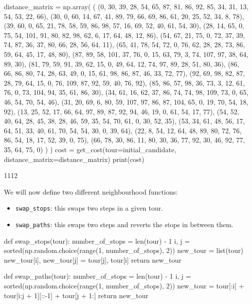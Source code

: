 \begin{pyin}
distance_matrix = np.array(
    (
    (0, 30, 39, 28, 54, 65, 87, 81, 86, 92, 85, 34, 31, 13, 54, 53, 22, 66),
    (30, 0, 60, 14, 67, 41, 89, 79, 66, 69, 86, 61, 20, 25, 52, 34, 8, 78),
    (39, 60, 0, 65, 21, 78, 58, 59, 86, 98, 57, 16, 69, 52, 40, 61, 54, 30),
    (28, 14, 65, 0, 75, 54, 101, 91, 80, 82, 98, 62, 6, 17, 64, 48, 12, 86),
    (54, 67, 21, 75, 0, 72, 37, 39, 74, 87, 36, 37, 80, 66, 28, 56, 64, 11),
    (65, 41, 78, 54, 72, 0, 76, 62, 28, 28, 73, 86, 59, 64, 45, 17, 48, 80),
    (87, 89, 58, 101, 37, 76, 0, 15, 63, 79, 3, 74, 107, 97, 38, 64, 89, 30),
    (81, 79, 59, 91, 39, 62, 15, 0, 49, 64, 12, 74, 97, 89, 28, 51, 80, 36),
    (86, 66, 86, 80, 74, 28, 63, 49, 0, 15, 61, 98, 86, 87, 46, 33, 72, 77),
    (92, 69, 98, 82, 87, 28, 79, 64, 15, 0, 76, 109, 87, 92, 59, 40, 76, 92),
    (85, 86, 57, 98, 36, 73, 3, 12, 61, 76, 0, 73, 104, 94, 35, 61, 86, 30),
    (34, 61, 16, 62, 37, 86, 74, 74, 98, 109, 73, 0, 65, 46, 54, 70, 54, 46),
    (31, 20, 69, 6, 80, 59, 107, 97, 86, 87, 104, 65, 0, 19, 70, 54, 18, 92),
    (13, 25, 52, 17, 66, 64, 97, 89, 87, 92, 94, 46, 19, 0, 61, 54, 17, 77),
    (54, 52, 40, 64, 28, 45, 38, 28, 46, 59, 35, 54, 70, 61, 0, 30, 52, 35),
    (53, 34, 61, 48, 56, 17, 64, 51, 33, 40, 61, 70, 54, 54, 30, 0, 39, 64),
    (22, 8, 54, 12, 64, 48, 89, 80, 72, 76, 86, 54, 18, 17, 52, 39, 0, 75),
    (66, 78, 30, 86, 11, 80, 30, 36, 77, 92, 30, 46, 92, 77, 35, 64, 75, 0)
    )
)
cost = get_cost(tour=initial_candidate, distance_matrix=distance_matrix)
print(cost)
\end{pyin}

\begin{pyout}
1112
\end{pyout}

We will now define two different neighbourhood functions:

\begin{itemize}
    \item \texttt{swap_stops}: this swaps two steps in a given tour.
    \item \texttt{swap_paths}: this swaps two steps and reverts the
        stops in between them.
\end{itemize}

\begin{pyin}
def swap_stops(tour):
    number_of_stops = len(tour) - 1
    i, j = sorted(np.random.choice(range(1, number_of_stops), 2))
    new_tour = list(tour)
    new_tour[i], new_tour[j] = tour[j], tour[i]
    return new_tour

def swap_paths(tour):
    number_of_stops = len(tour) - 1
    i, j = sorted(np.random.choice(range(1, number_of_stops), 2))
    new_tour = tour[:i] + tour[i:j + 1][::-1] + tour[j + 1:]
    return new_tour
\end{pyin}

